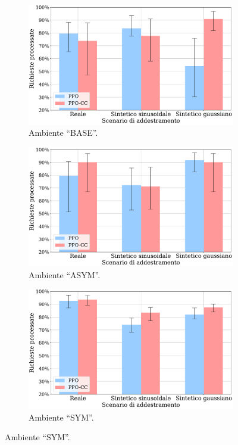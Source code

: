 \documentclass[a4paper, twocolumn]{article}
\begin{document}
\begin{figure}
    \centering

    \begin{subfigure}{\columnwidth}
        \centering
        \includegraphics[width=\linewidth]{assets/5/results/eval_BASE_summary_processed_requests.pdf}
        \caption{Ambiente ``BASE''.}
    \end{subfigure}
    
    \begin{subfigure}{\columnwidth}
        \centering
        \includegraphics[width=\linewidth]{assets/5/results/eval_ASYM_summary_processed_requests.pdf}
        \caption{Ambiente ``ASYM''.}
    \end{subfigure}
    
    \begin{subfigure}{\columnwidth}
        \centering
        \includegraphics[width=\linewidth]{assets/5/results/eval_SYM_summary_processed_requests.pdf}
        \caption{Ambiente ``SYM''.}
    \end{subfigure}
    

\end{figure}
\end{document}
